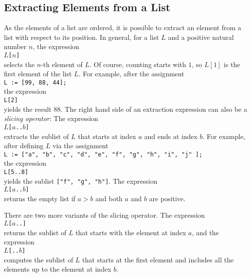 \subsection{Extracting Elements from a List}
As the elements of a list are ordered, it is possible to extract an element from a list with respect
to its position.  In general, for a list $L$ and a positive natural number $n$, the expression
\\[0.2cm]
\hspace*{1.3cm}
\texttt{$L$[$n$]}
\\[0.2cm]
selects the $n$-th element of $L$.  Of course, counting starts with $1$, so $L[1]$ is the first element
of the list $L$.  For example, after the assignment
\\[0.2cm]
\hspace*{1.3cm}
\texttt{L := [99, 88, 44];}
\\[0.2cm]
the expression 
\\[0.2cm]
\hspace*{1.3cm}
\texttt{L[2]}
\\[0.2cm]
yields the result $88$.  The right hand side of an extraction expression can also be a \emph{slicing operator}:
The expression
\\[0.2cm]
\hspace*{1.3cm}
\texttt{$L$[$a$..$b$]}
\\[0.2cm]
extracts the sublist of $L$ that starts at index $a$ and ends at index $b$.  For example,
after defining $L$ via the assignment
\\[0.2cm]
\hspace*{1.3cm}
\texttt{L := ["a", "b", "c", "d", "e", "f", "g", "h", "i", "j" ];}
\\[0.2cm]
the expression
\\[0.2cm]
\hspace*{1.3cm}
\texttt{L[5..8]}
\\[0.2cm]
yields the sublist \texttt{["f", "g", "h"]}.  The  expression 
\\[0.2cm]
\hspace*{1.3cm}
\texttt{$L$[$a$..$b$]}
\\[0.2cm]
returns the empty list if $a > b$ and both $a$ and $b$ are positive.  

There are two more variants of the slicing operator.   The expression
\\[0.2cm]
\hspace*{1.3cm}
\texttt{$L$[$a$..]}
\\[0.2cm]
returns the sublist of $L$ that starts with the element at index $a$, and the expression
\\[0.2cm]
\hspace*{1.3cm}
\texttt{$L$[..$b$]}
\\[0.2cm]
computes the sublist of $L$ that starts at the first element and includes all the elements up to the
element at index $b$.

